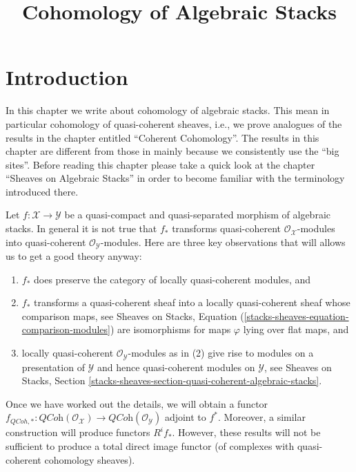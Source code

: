 

%


\title{Cohomology of Algebraic Stacks}

\maketitle

\label{section-phantom}

\tableofcontents




\section{Introduction}
\label{section-introduction}

\noindent
In this chapter we write about cohomology of algebraic stacks.
This mean in particular cohomology of quasi-coherent sheaves, i.e.,
we prove analogues of the results in the chapter entitled
``Coherent Cohomology''. The results in this chapter are different
from those in \cite{LM-B} mainly because we consistently use the
``big sites''. Before reading this chapter please take a quick look at
the chapter ``Sheaves on Algebraic Stacks'' in order to become
familiar with the terminology introduced there.

\medskip\noindent
Let $f : \mathcal{X} \to \mathcal{Y}$ be a quasi-compact and
quasi-separated morphism of algebraic stacks. In general it is not true that
$f_*$ transforms quasi-coherent $\mathcal{O}_\mathcal{X}$-modules
into quasi-coherent $\mathcal{O}_\mathcal{Y}$-modules. Here are
three key observations that will allows us to get a good theory anyway:
\begin{enumerate}
\item $f_*$ does preserve the category of locally quasi-coherent modules, and
\item $f_*$ transforms a quasi-coherent sheaf into a locally quasi-coherent
sheaf whose comparison maps, see
Sheaves on Stacks, Equation (\ref{stacks-sheaves-equation-comparison-modules})
are isomorphisms for maps $\varphi$ lying over flat maps, and
\item locally quasi-coherent $\mathcal{O}_\mathcal{Y}$-modules as in (2)
give rise to modules on a presentation of $\mathcal{Y}$ and hence
quasi-coherent modules on $\mathcal{Y}$, see
Sheaves on Stacks, Section
\ref{stacks-sheaves-section-quasi-coherent-algebraic-stacks}.
\end{enumerate}
Once we have worked out the details, we will obtain a functor
$f_{QCoh, *} : \textit{QCoh}(\mathcal{O}_\mathcal{X})
\to \textit{QCoh}(\mathcal{O}_\mathcal{Y})$ adjoint to $f^*$.
Moreover, a similar construction will produce functors $R^if_*$.
However, these results will not be sufficient to produce a
total direct image functor (of complexes with quasi-coherent
cohomology sheaves).




